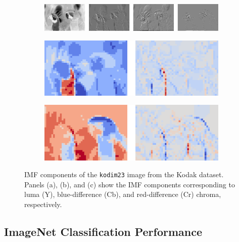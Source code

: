 \begin{figure}[t]
	\centering
	\begin{subfigure}{\textwidth}
		\centering
		\includegraphics[width=.95\textwidth]{figures/kodim23_y_componets.pdf}
		\caption{}
		\label{fig: y componets}
	\end{subfigure}
	
	\begin{subfigure}{.455\textwidth}
		\centering
		\vspace{10pt}
		\includegraphics[width=.95\textwidth]{figures/kodim23_cb_componets.pdf}
		\caption{}
		\label{fig: cb componets}
	\end{subfigure}%
	\begin{subfigure}{.45\textwidth}
		\centering
		\vspace{10pt}
		\includegraphics[width=.95\textwidth]{figures/kodim23_cr_componets.pdf}
		\caption{}
		\label{fig: cr componets}
	\end{subfigure}
	\caption{IMF components of the \texttt{kodim23} image from the Kodak dataset. Panels (a), (b), and (c) show the IMF components corresponding to luma (Y), blue-difference (Cb), and red-difference (Cr) chroma, respectively.}
	\label{fig: imf components}
\end{figure}



\subsection{ImageNet Classification Performance} \label{sec: imagenet Classification Performance}


